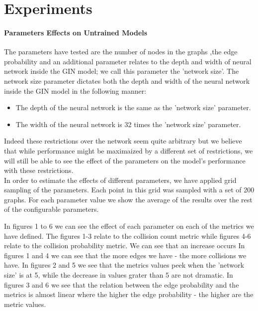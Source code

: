 \documentclass{article}
\begin{document}
\part*{Experiments}
\subsection*{Parameters Effects on Untrained Models}
The parameters have tested are the number of nodes in the graphs ,the edge probability and an additional parameter
relates to the depth and width of neural network inside the GIN model; we call this parameter the 'network size'.
The network size parameter dictates both the depth and width of the neural network inside the GIN model in the following manner:
\begin{itemize}
    \item The depth of the neural network is the same as the 'network size' parameter.
    \item The width of the neural network is 32 times the 'network size' parameter.
\end{itemize}
Indeed these restrictions over the network seem quite arbitrary but we believe that while performance might be maximaized by
a different set of restrictions, we will still be able to see the effect of the parameters on the model's performance with these restrictions.\\
In order to estimate the effects of different parameters, we have applied grid sampling of the parameters.
Each point in this grid was sampled with a set of 200 graphs.
For each parameter value we show the average of the results over the rest of the configurable parameters.

In figures 1 to 6 we can see the effect of each parameter on each of the metrics we have defined.
The figures 1-3 relate to the collision count metric while figures 4-6 relate to the collision probability metric.
We can see that an increase occurs In figures 1 and 4 we can see that the more edges we have - the more collisions we have.
In figures 2 and 5 we see that the metrics values peek when the 'network size' is at 5,
while the decrease in values grater than 5 are not dramatic.
In figures 3 and 6 we see that the relation between the edge probability and the metrics is almost linear where the
higher the edge probability - the higher are the metric values.
\end{document}

